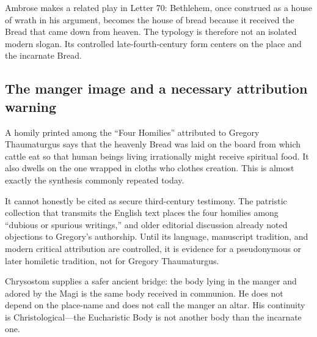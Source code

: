 Ambrose makes a related play in Letter 70: Bethlehem, once construed as a
house of wrath in his argument, becomes the house of bread because it received
the Bread that came down from heaven. The typology is therefore not an isolated
modern slogan. Its controlled late-fourth-century form centers on the place
and the incarnate Bread.

\subsection{The manger image and a necessary attribution warning}

A homily printed among the ``Four Homilies'' attributed to Gregory
Thaumaturgus says that the heavenly Bread was laid on the board from which
cattle eat so that human beings living irrationally might receive spiritual
food. It also dwells on the one wrapped in cloths who clothes creation.
This is almost exactly the synthesis commonly repeated today.

It cannot honestly be cited as secure third-century testimony. The patristic
collection that transmits the English text places the four homilies among
``dubious or spurious writings,'' and older editorial discussion already noted
objections to Gregory's authorship. Until its language, manuscript tradition,
and modern critical attribution are controlled, it is evidence for a
pseudonymous or later homiletic tradition, not for Gregory Thaumaturgus.

Chrysostom supplies a safer ancient bridge: the body lying in the manger and
adored by the Magi is the same body received in communion. He does not depend
on the place-name and does not call the manger an altar. His continuity is
Christological---the Eucharistic Body is not another body than the incarnate
one.

